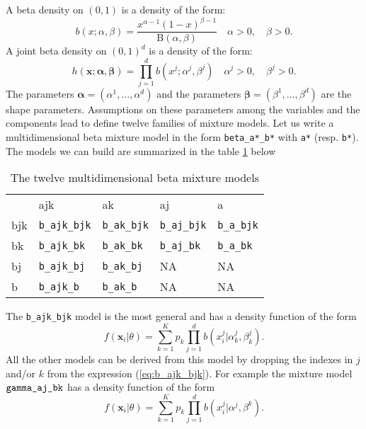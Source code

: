 \documentclass[a4paper,10pt]{article}
\newcommand{\bx}{\mathbf{x}}
\newcommand{\balpha}{\boldsymbol{\alpha}}
\newcommand{\bbeta}{\boldsymbol{\beta}}
\begin{document}
A beta density on $(0,1)$ is a density of the form:
\begin{equation}\label{law::beta-density}
b(x;\alpha,\beta) = \frac{x^{\alpha-1}(1-x)^{\beta-1}} {\mathrm{B}(\alpha,\beta)} \quad \alpha>0, \quad \beta>0.
\end{equation}
A joint beta density on $(0,1)^d$ is a density of the form:
\begin{equation}\label{law::joint-beta-density}
h(\bx;\balpha,\bbeta) = \prod_{j=1}^d b(x^j;\alpha^j,\beta^j) \quad \alpha^j>0, \quad \beta^j>0.
\end{equation}
The parameters $\balpha=(\alpha^1,\ldots,\alpha^d)$ and the parameters $\bbeta=(\beta^1,\ldots,\beta^d)$ are the
shape parameters. Assumptions on these parameters among the variables and the components
lead to define twelve families of mixture models. Let us write a multidimensional beta mixture model in the form
\verb+beta_a*_b*+ with \verb+a*+ (resp. \verb+b*+).
The models we can build are summarized in the table \ref{tab:betamodels} below
\begin{table}[htb]
\begin{center}
\begin{tabular}{lllll}
    &  ajk                    &  ak                     &  aj           &  a \\
bjk & \verb+b_ajk_bjk+  & \verb+b_ak_bjk+ & \verb+b_aj_bjk+ & \verb+b_a_bjk+\\
bk  & \verb+b_ajk_bk+   & \verb+b_ak_bk+  & \verb+b_aj_bk+  & \verb+b_a_bk+  \\
bj  & \verb+b_ajk_bj+   & \verb+b_ak_bj+  & NA  & NA  \\
b   & \verb+b_ajk_b+    & \verb+b_ak_b+   & NA  & NA \\
\end{tabular}
\end{center}
\caption{The twelve multidimensional beta mixture models}
\label{tab:betamodels}
\end{table}

The \verb+b_ajk_bjk+ model is the most general and has a density function of the form
\begin{equation}\label{eq:b_ajk_bjk}
  f({\bx}_i|\theta) = \sum_{k=1}^K p_k \prod_{j=1}^d b(x^j_{i}| \alpha^j_{k},\beta^j_{k}).
\end{equation}
All the other models can be derived from this model by dropping the indexes in $j$ and/or $k$
from the expression (\ref{eq:b_ajk_bjk}). For example the mixture model $\verb+gamma_aj_bk+$ has a density
function of the form
\begin{equation}\label{eq:b_aj_bk}
  f({\bx}_i|\theta) = \sum_{k=1}^K p_k \prod_{j=1}^d b(x^j_{i}| \alpha^j,\beta^{k}).
\end{equation}
\end{document}

